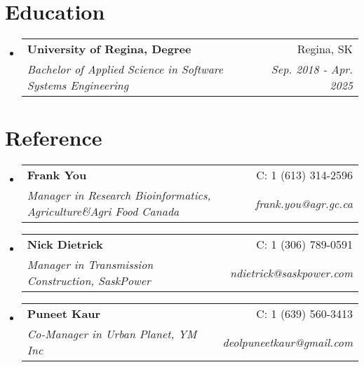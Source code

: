 \documentclass[letterpaper,11pt]{article}
\makeatletter
\newcommand{\resumeSubheading}[4]{
    \vspace{1pt}\item
    \begin{tabular*}{0.97\textwidth}[t]{l@{\extracolsep{\fill}}r}
        \textbf{#1} & #2 \\
        \textit{\small#3} & \textit{\small #4} \\
    \end{tabular*}\vspace{-4pt}
}
\newcommand{\resumeSubHeadingListStart}{\begin{itemize}[leftmargin=0.15in, label={}]}
\newcommand{\resumeSubHeadingListEnd}{\end{itemize}}
\makeatother
\begin{document}
    \section{Education}
        \resumeSubHeadingListStart
            \resumeSubheading
                {University of Regina, Degree}{Regina, SK}
                {Bachelor of Applied Science in Software Systems Engineering}{Sep. 2018 - Apr. 2025}
            \resumeSubHeadingListEnd
        

    \section{Reference}
    \resumeSubHeadingListStart
        \resumeSubheading
            {Frank You}{C: 1 (613) 314-2596}
            {Manager in Research Bioinformatics, Agriculture\&Agri Food Canada}{frank.you@agr.gc.ca}
        \resumeSubheading
            {Nick Dietrick}{C: 1 (306) 789-0591}
            {Manager in Transmission Construction, SaskPower}{ndietrick@saskpower.com}
        \resumeSubheading
            {Puneet Kaur}{C: 1 (639) 560-3413}
            {Co-Manager in Urban Planet, YM Inc}{deolpuneetkaur@gmail.com}
    \resumeSubHeadingListEnd

\end{document}
